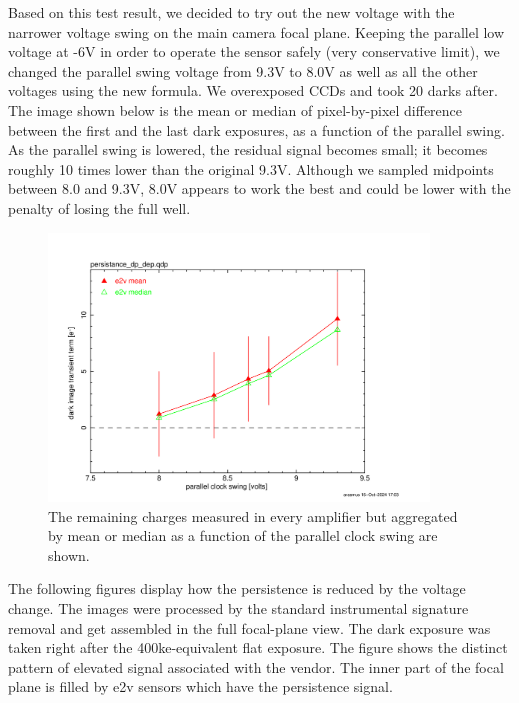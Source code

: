 Based on this test result, we decided to try out the new voltage with
the narrower voltage swing on the main camera focal plane. Keeping the
parallel low voltage at -6V in order to operate the sensor safely (very
conservative limit), we changed the parallel swing voltage from 9.3V to
8.0V as well as all the other voltages using the new formula. We
overexposed CCDs and took 20 darks after. The image shown below is the
mean or median of pixel-by-pixel difference between the first and the
last dark exposures, as a function of the parallel swing. As the
parallel swing is lowered, the residual signal becomes small; it becomes
roughly 10 times lower than the original 9.3V. Although we sampled
midpoints between 8.0 and 9.3V, 8.0V appears to work the best and could
be lower with the penalty of losing the full well.

\begin{figure}
\begin{centering}
\includegraphics[width=0.9\textwidth]{sections/figures/e2v_transient_dark_vs_dp.png}
\end{centering}
\caption{The remaining charges measured in every amplifier but
aggregated by mean or median as a function of the parallel clock swing
are shown.}
\end{figure}

The following figures display how the persistence is reduced by the
voltage change. The images were processed by the standard instrumental
signature removal and get assembled in the full focal-plane view. The
dark exposure was taken right after the 400ke-equivalent flat exposure.
The figure shows the distinct pattern of elevated signal associated with
the vendor. The inner part of the focal plane is filled by e2v sensors
which have the persistence signal.

